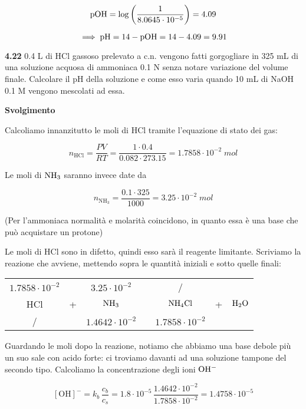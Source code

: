 $$\rm pOH=\log \left( \frac{1}{8.0645 \cdot 10^{-5}} \right)=4.09$$

$$\implies \rm pH=14-pOH=14-4.09=9.91$$

\newpage

\textbf{4.22} 0.4 L di HCl gassoso prelevato a c.n. vengono fatti gorgogliare in 325 mL di una soluzione acquosa di ammoniaca 0.1 N senza notare variazione del volume finale. Calcolare il pH della soluzione e come esso varia quando 10 mL di NaOH 0.1 M vengono mescolati ad essa.

\vspace{0.2cm}\large\textbf{Svolgimento}\normalsize

\vspace{0.2cm} Calcoliamo innanzitutto le moli di HCl tramite l'equazione di stato dei gas:

$$n_{\text{HCl}}=\frac{PV}{RT}=\frac{1 \cdot 0.4}{0.082 \cdot 273.15}=1.7858 \cdot 10^{-2}\;mol$$

Le moli di $\rm NH_3$ saranno invece date da

$$n_{\text{NH}_3}=\frac{0.1 \cdot 325}{1000}=3.25 \cdot 10^{-2}\;mol$$

(Per l'ammoniaca normalità e molarità coincidono, in quanto essa è una base che può acquistare un protone)

Le moli di HCl sono in difetto, quindi esso sarà il reagente limitante. Scriviamo la reazione che avviene, mettendo sopra le quantità iniziali e sotto quelle finali:

\begin{center}
    \begin{tabular}{ccccccc}
        $1.7858 \cdot 10^{-2}$ &  & $3.25 \cdot 10^{-2}$ & & / & &\\
        HCl & + & $\rm NH_3$ & \ce{->} & $\rm NH_4Cl$ & + & $\rm H_2O$\\
        / &  &  $1.4642 \cdot 10^{-2}$ & & $1.7858 \cdot 10^{-2}$ & &\\
    \end{tabular}
\end{center}

Guardando le moli dopo la reazione, notiamo che abbiamo una base debole più un suo sale con acido forte: ci troviamo davanti ad una soluzione tampone del secondo tipo. Calcoliamo la concentrazione degli ioni $\rm OH^-$

$$[\text{OH}]^-=k_b\,\frac{c_b}{c_s}
=1.8 \cdot 10^{-5}\,\frac{1.4642 \cdot 10^{-2}}{1.7858 \cdot 10^{-2}}
=1.4758 \cdot 10^{-5}$$

